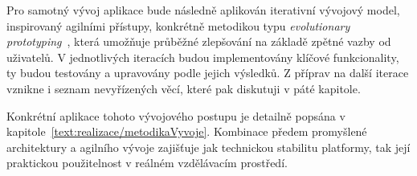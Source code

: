 Pro samotný vývoj aplikace bude následně aplikován iterativní vývojový model, inspirovaný agilními přístupy, konkrétně metodikou typu \textit{evolutionary prototyping}~\cite{somerville2015software}, která umožňuje průběžné zlepšování na základě zpětné vazby od uživatelů. 
V jednotlivých iteracích budou implementovány klíčové funkcionality, ty budou testovány a upravovány podle jejich výsledků.
Z příprav na další iterace vznikne i seznam nevyřízených věcí, které pak diskutuji v páté kapitole.

Konkrétní aplikace tohoto vývojového postupu je detailně popsána v kapitole~\ref{text:realizace/metodikaVyvoje}.
Kombinace předem promyšlené architektury a agilního vývoje zajišťuje jak technickou stabilitu platformy, tak její praktickou použitelnost v reálném vzdělávacím prostředí.








